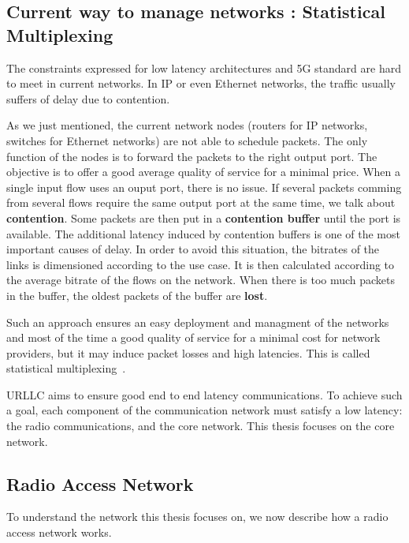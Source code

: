 \subsection{Current way to manage networks : Statistical Multiplexing}


The constraints expressed for low latency architectures and 5G standard are hard to meet in current networks. In IP or even Ethernet networks, the traffic usually suffers of delay due to contention. 

As we just mentioned, the current network nodes (routers for IP networks, switches for Ethernet networks) are not able to schedule packets. The only function of the nodes is to forward the packets to the right output port.
The objective is to offer a good average quality of service for a minimal price. When a single input flow uses an ouput port, there is no issue.
 If several packets comming from several flows require the same output port at the same time, we talk about \textbf{contention}. Some packets are then put in a \textbf{contention buffer} until the port is available. The additional latency induced by contention buffers is one of the most important causes of delay. In order to avoid this situation, the bitrates of the links is dimensioned according to the use case. It is then calculated according to the average bitrate of the flows on the network. 
 When there is too much packets in the buffer, the oldest packets of the buffer are \textbf{lost}. 

Such an approach ensures an easy deployment and managment of the networks and most of the time a good quality of service for a minimal cost for network providers, but it may induce packet losses and high latencies. This is called statistical multiplexing~\cite{krishnamurthy2003latency,venkatramani1994supporting}. 

URLLC aims to ensure good end to end latency communications. To achieve such a goal, each component of the communication network must satisfy a low latency: the radio communications, and the core network. This thesis focuses on the core network. 

\subsection{\textbf{R}adio \textbf{A}ccess \textbf{N}etwork}

To understand the network this thesis focuses on, we now describe how a radio access network works.

